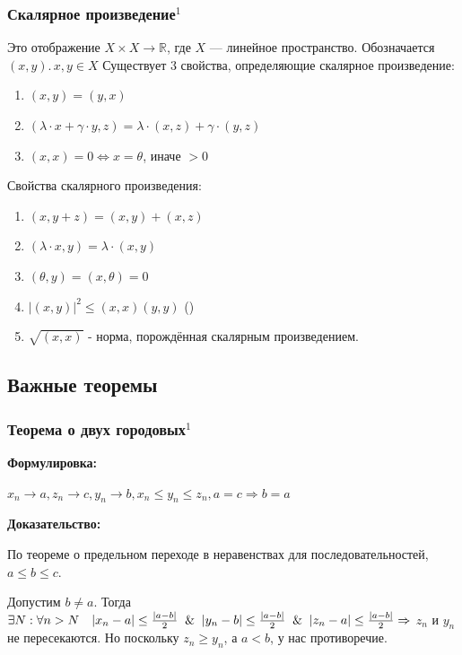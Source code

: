 \documentclass{article}
\begin{document}
\subsubsection{Скалярное произведение\texorpdfstring{$^1$}{}}
Это отображение $X \times X \rightarrow \mathbb{R}$, где $X$ --- линейное пространство. Обозначается $(x, y).\, x, y \in X$ Существует 3 свойства, определяющие скалярное произведение:
\begin{enumerate}
    \item $(x, y) = (y, x)$
    \item $(\lambda \cdot x + \gamma \cdot y, z) = \lambda \cdot (x, z) + \gamma \cdot (y, z)$
    \item $(x, x) = 0 \Leftrightarrow x = \theta$, иначе $>0$
\end{enumerate}

Свойства скалярного произведения:
\begin{enumerate}
    \item $(x, y + z) = (x, y) + (x, z)$
    \item $(\lambda \cdot x, y) = \lambda \cdot (x, y)$
    \item $(\theta, y) = (x, \theta) = 0$
    \item $|(x, y)|^2 \le (x, x)(y, y)$ ()
    \item $\sqrt{(x, x)}$ - норма, порождённая скалярным произведением.
\end{enumerate}

\newpage
\subsection{Важные теоремы}

\subsubsection{Теорема о двух городовых\texorpdfstring{$^1$}{}}
\textbf{Формулировка:}

$x_n \rightarrow a, z_n \rightarrow c, y_n \rightarrow b, x_n \le y_n \le z_n, a = c \Rightarrow b = a$

\textbf{Доказательство:}

По теореме о предельном переходе в неравенствах для последовательностей, $a \le b \le c$. 

Допустим $b \ne a$. Тогда $\exists N : \forall n > N \quad |x_n - a| \le \frac{|a - b|}{2} \And |y_n - b| \le \frac{|a - b|}{2} \And |z_n - a| \le \frac{|a - b|}{2} \Rightarrow$ $z_n$ и $y_n$ не пересекаются. Но поскольку $z_n \ge y_n$, а $a < b$, у нас противоречие.
\end{document}
